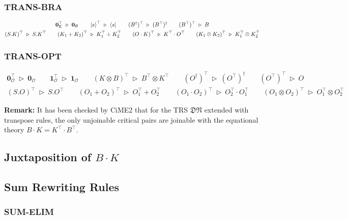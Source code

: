 \documentclass[manuscript, review, timestamp]{acmart}
\newcommand*{\reduce}{\ \triangleright\ }
\begin{document}
\subsubsection*{\textsf{TRANS-BRA}}
\begin{gather*}
  \mathbf{0}_\mathcal{K}^\top \reduce \mathbf{0}_\mathcal{B}
  \qquad
  \ket{s}^\top \reduce \bra{s}
  \qquad
  (B^\dagger)^\top \reduce (B^\top)^\dagger
  \qquad
  (B^\top)^\top \reduce B \\
  (S . K)^\top \reduce S . K^\top
  \qquad
  (K_1 + K_2)^\top \reduce K_1^\top + K_2^\top
  \qquad
  (O \cdot K)^\top \reduce K^\top \cdot O^\top
  \qquad
  (K_1 \otimes K_2)^\top \reduce K_1^\top \otimes K_2^\top
\end{gather*}



\subsubsection*{\textsf{TRANS-OPT}}
\begin{gather*}
  \mathbf{0}_\mathcal{O}^\top \reduce \mathbf{0}_\mathcal{O}
  \qquad
  \mathbf{1}_\mathcal{O}^\top \reduce \mathbf{1}_\mathcal{O}
  \qquad
  (K \otimes B)^\top \reduce B^\top \otimes K^\top
  \qquad
  (O^\dagger)^\top \reduce (O^\top)^\dagger
  \qquad
  (O^\top)^\top \reduce O \\
  (S . O)^\top \reduce S . O^\top
  \qquad
  (O_1 + O_2)^\top \reduce O_1^\top + O_2^\top
  \qquad
  (O_1 \cdot O_2)^\top \reduce O_2^\top \cdot O_1^\top
  \qquad
  (O_1 \otimes O_2)^\top \reduce O_1^\top \otimes O_2^\top
\end{gather*}

\textbf{Remark:} It has been checked by CiME2 that for the TRS $\mathfrak{DN}$ extended with transpose rules, the only unjoinable critical pairs are joinable with the equational theory $B\cdot K = K^\top \cdot B^\top$.

\subsection{Juxtaposition of $B\cdot K$}


\subsection{Sum Rewriting Rules}
\subsubsection*{\textsf{SUM-ELIM}}
\end{document}
